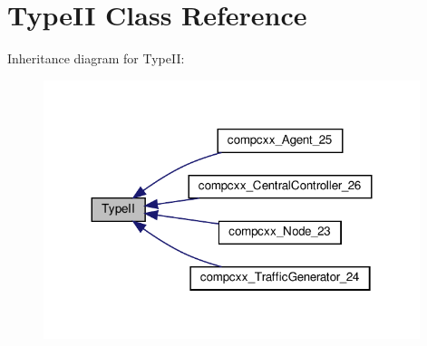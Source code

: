 \hypertarget{classTypeII}{}\section{Type\+II Class Reference}
\label{classTypeII}


Inheritance diagram for Type\+II\+:\nopagebreak
\begin{figure}[H]
\begin{center}
\leavevmode
\includegraphics[width=311pt]{classTypeII__inherit__graph}
\end{center}
\end{figure}
